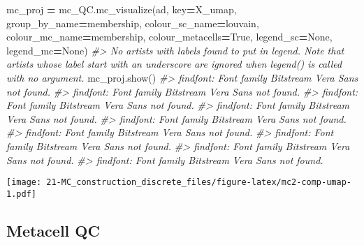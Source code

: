 \documentclass[
]{book}
\newenvironment{Shaded}{\begin{snugshade}}{\end{snugshade}}
\newcommand{\CommentTok}[1]{\textcolor[rgb]{0.56,0.35,0.01}{\textit{#1}}}
\newcommand{\NormalTok}[1]{#1}
\newcommand{\OperatorTok}[1]{\textcolor[rgb]{0.81,0.36,0.00}{\textbf{#1}}}
\newcommand{\StringTok}[1]{\textcolor[rgb]{0.31,0.60,0.02}{#1}}
\newcommand{\VariableTok}[1]{\textcolor[rgb]{0.00,0.00,0.00}{#1}}
\begin{document}
\begin{Shaded}
\begin{Highlighting}[]
\NormalTok{mc\_proj }\OperatorTok{=}\NormalTok{ mc\_QC.mc\_visualize(ad, key}\OperatorTok{=}\StringTok{\textquotesingle{}X\_umap\textquotesingle{}}\NormalTok{, group\_by\_name}\OperatorTok{=}\StringTok{\textquotesingle{}membership\textquotesingle{}}\NormalTok{, colour\_sc\_name}\OperatorTok{=}\StringTok{\textquotesingle{}louvain\textquotesingle{}}\NormalTok{,  colour\_mc\_name}\OperatorTok{=}\StringTok{\textquotesingle{}membership\textquotesingle{}}\NormalTok{, colour\_metacells}\OperatorTok{=}\VariableTok{True}\NormalTok{, legend\_sc}\OperatorTok{=}\VariableTok{None}\NormalTok{, legend\_mc}\OperatorTok{=}\VariableTok{None}\NormalTok{)}
\CommentTok{\#\textgreater{} No artists with labels found to put in legend.  Note that artists whose label start with an underscore are ignored when legend() is called with no argument.}
\NormalTok{mc\_proj.show()}
\CommentTok{\#\textgreater{} findfont: Font family \textquotesingle{}Bitstream Vera Sans\textquotesingle{} not found.}
\CommentTok{\#\textgreater{} findfont: Font family \textquotesingle{}Bitstream Vera Sans\textquotesingle{} not found.}
\CommentTok{\#\textgreater{} findfont: Font family \textquotesingle{}Bitstream Vera Sans\textquotesingle{} not found.}
\CommentTok{\#\textgreater{} findfont: Font family \textquotesingle{}Bitstream Vera Sans\textquotesingle{} not found.}
\CommentTok{\#\textgreater{} findfont: Font family \textquotesingle{}Bitstream Vera Sans\textquotesingle{} not found.}
\CommentTok{\#\textgreater{} findfont: Font family \textquotesingle{}Bitstream Vera Sans\textquotesingle{} not found.}
\CommentTok{\#\textgreater{} findfont: Font family \textquotesingle{}Bitstream Vera Sans\textquotesingle{} not found.}
\CommentTok{\#\textgreater{} findfont: Font family \textquotesingle{}Bitstream Vera Sans\textquotesingle{} not found.}
\CommentTok{\#\textgreater{} findfont: Font family \textquotesingle{}Bitstream Vera Sans\textquotesingle{} not found.}
\end{Highlighting}
\end{Shaded}

\texttt{[image: 21-MC\_construction\_discrete\_files/figure-latex/mc2-comp-umap-1.pdf]}

\hypertarget{metacell-qc}{%
\subsection{Metacell QC}\label{metacell-qc}}
\end{document}
